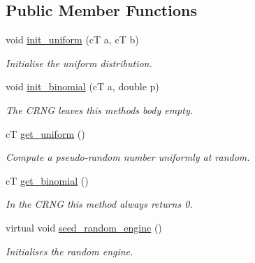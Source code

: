 \subsection*{Public Member Functions}
\begin{DoxyCompactItemize}
\item 
void \hyperlink{classlgraph_1_1utils_1_1crandom__generator_addfa5951276296b2a164e5dc482728ce}{init\+\_\+uniform} (cT a, cT b)
\begin{DoxyCompactList}\small\item\em Initialise the uniform distribution. \end{DoxyCompactList}\item 
void \hyperlink{classlgraph_1_1utils_1_1crandom__generator_a4d7042cb0862c3b8b4792890e6c5388c}{init\+\_\+binomial} (cT a, double p)\hypertarget{classlgraph_1_1utils_1_1crandom__generator_a4d7042cb0862c3b8b4792890e6c5388c}{}\label{classlgraph_1_1utils_1_1crandom__generator_a4d7042cb0862c3b8b4792890e6c5388c}

\begin{DoxyCompactList}\small\item\em The C\+R\+NG leaves this method\textquotesingle{}s body empty. \end{DoxyCompactList}\item 
cT \hyperlink{classlgraph_1_1utils_1_1crandom__generator_a39dd7f9d80fd5be685cc240719050119}{get\+\_\+uniform} ()\hypertarget{classlgraph_1_1utils_1_1crandom__generator_a39dd7f9d80fd5be685cc240719050119}{}\label{classlgraph_1_1utils_1_1crandom__generator_a39dd7f9d80fd5be685cc240719050119}

\begin{DoxyCompactList}\small\item\em Compute a pseudo-\/random number uniformly at random. \end{DoxyCompactList}\item 
cT \hyperlink{classlgraph_1_1utils_1_1crandom__generator_ac1f724180b858b6a1f67451060de6896}{get\+\_\+binomial} ()\hypertarget{classlgraph_1_1utils_1_1crandom__generator_ac1f724180b858b6a1f67451060de6896}{}\label{classlgraph_1_1utils_1_1crandom__generator_ac1f724180b858b6a1f67451060de6896}

\begin{DoxyCompactList}\small\item\em In the C\+R\+NG this method always returns 0. \end{DoxyCompactList}\item 
virtual void \hyperlink{classlgraph_1_1utils_1_1random__generator_a4eb6998070eecb59bd89dca92d8a509c}{seed\+\_\+random\+\_\+engine} ()\hypertarget{classlgraph_1_1utils_1_1random__generator_a4eb6998070eecb59bd89dca92d8a509c}{}\label{classlgraph_1_1utils_1_1random__generator_a4eb6998070eecb59bd89dca92d8a509c}

\begin{DoxyCompactList}\small\item\em Initialises the random engine. \end{DoxyCompactList}\end{DoxyCompactItemize}
